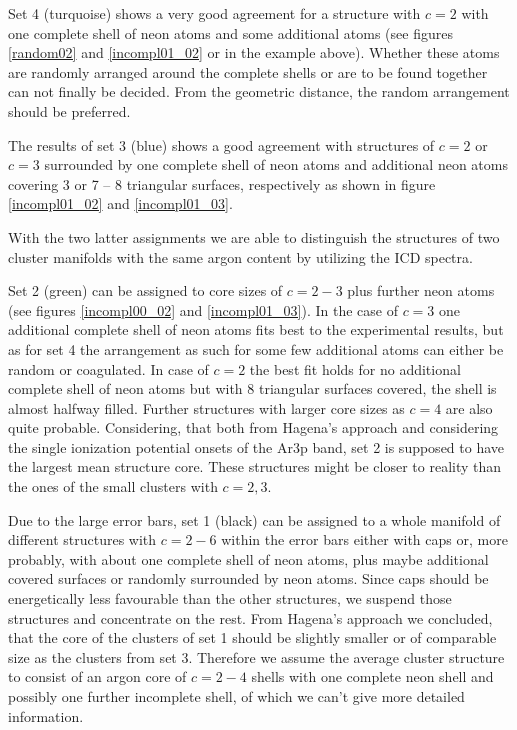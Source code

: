 Set 4 (turquoise) shows a very good agreement for a structure with $c=2$ with one
complete shell of neon atoms and some additional atoms (see figures
\ref{random02} and \ref{incompl01_02} or in the example above). Whether these atoms are
randomly arranged around the complete shells or are to be found together can not
finally be decided. From the geometric distance, the random arrangement should
be preferred.

The results of set 3 (blue) shows a good agreement with structures
of $c=2$ or $c=3$ surrounded by one complete shell of neon atoms and additional
neon atoms covering 3 or 7 -- 8 triangular surfaces, respectively 
as shown in figure \ref{incompl01_02} and \ref{incompl01_03}. 

With the two latter assignments we are able to distinguish
the structures of two cluster manifolds with the same argon content by utilizing the
ICD spectra.

Set 2 (green) can be assigned to core sizes of $c=2-3$ plus further neon atoms
(see figures \ref{incompl00_02} and \ref{incompl01_03}).
In the case of $c=3$ one additional complete shell of neon atoms fits
best to the experimental results, but as for set 4 the arrangement as such for
some few additional atoms can either be random or coagulated.
In case of $c=2$ the best fit holds for no additional complete shell of
neon atoms but with 8 triangular surfaces covered, the shell is almost halfway filled.
Further structures with larger core sizes as $c=4$
are also quite probable. Considering, that 
both from Hagena's approach and considering the single ionization potential
onsets of the Ar3p band, set 2 is supposed to have the largest mean structure
core. These structures might be closer to reality than the ones of the small clusters
with $c=2,3$.

Due to the large error bars, set 1 (black) can be assigned to a whole manifold
of different structures with $c = 2 - 6$ within the error bars
either with caps or, more probably,
with about one complete shell of neon atoms, plus maybe additional covered surfaces
or randomly surrounded by neon atoms. Since caps should be energetically less
favourable than the other structures, we suspend those structures and concentrate
on the rest.
From Hagena's approach we concluded, that the core of the clusters of set 1
should be slightly
smaller or of comparable size as the clusters from set 3. Therefore we assume
the average cluster structure to consist of an argon core of $c=2-4$ shells
with one complete neon shell and possibly one further incomplete shell, of
which we can't give more detailed information.

